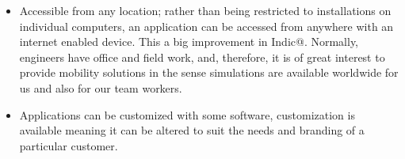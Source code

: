 \begin{itemize}
    \item Accessible from any location; rather than being restricted to installations on individual computers, an application can be accessed from anywhere with an internet enabled device. This a big improvement in Indic@. Normally, engineers have office and field work, and, therefore, it is of great interest to provide mobility solutions in the sense simulations are available worldwide for us and also for our team workers.
    \item Applications can be customized with some software, customization is available meaning it can be altered to suit the needs and branding of a particular customer.
		\end{itemize}